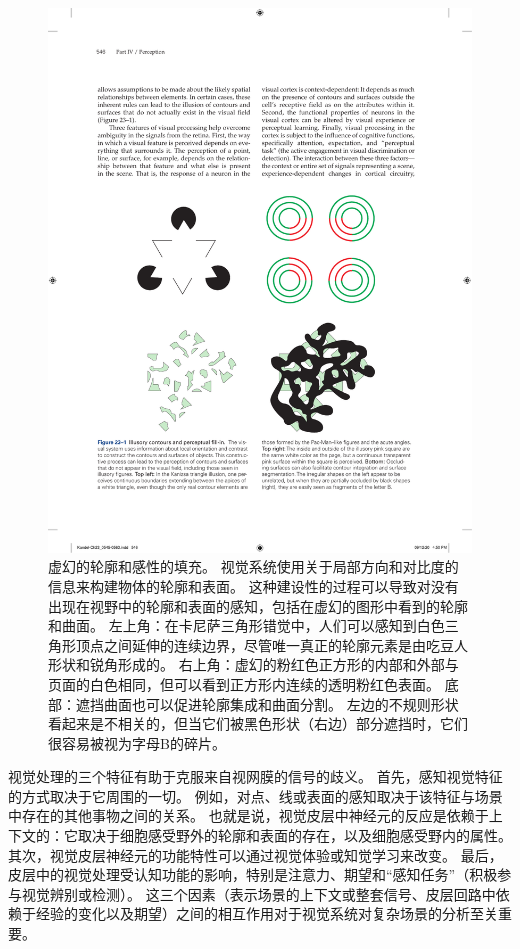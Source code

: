 \begin{figure}[htbp]
	\centering
	\includegraphics[width=1.0\linewidth]{chap23/fig_23_1}
	\caption{虚幻的轮廓和感性的填充。
		视觉系统使用关于局部方向和对比度的信息来构建物体的轮廓和表面。
		这种建设性的过程可以导致对没有出现在视野中的轮廓和表面的感知，包括在虚幻的图形中看到的轮廓和曲面。
		左上角：在卡尼萨三角形错觉中，人们可以感知到白色三角形顶点之间延伸的连续边界，尽管唯一真正的轮廓元素是由吃豆人形状和锐角形成的。
		右上角：虚幻的粉红色正方形的内部和外部与页面的白色相同，但可以看到正方形内连续的透明粉红色表面。
		底部：遮挡曲面也可以促进轮廓集成和曲面分割。
		左边的不规则形状看起来是不相关的，但当它们被黑色形状（右边）部分遮挡时，它们很容易被视为字母B的碎片。}
	\label{fig:23_1}
\end{figure}


视觉处理的三个特征有助于克服来自视网膜的信号的歧义。
首先，感知视觉特征的方式取决于它周围的一切。
例如，对点、线或表面的感知取决于该特征与场景中存在的其他事物之间的关系。
也就是说，视觉皮层中神经元的反应是依赖于上下文的：它取决于细胞感受野外的轮廓和表面的存在，以及细胞感受野内的属性。
其次，视觉皮层神经元的功能特性可以通过视觉体验或知觉学习来改变。
最后，皮层中的视觉处理受认知功能的影响，特别是注意力、期望和“感知任务”（积极参与视觉辨别或检测）。
这三个因素（表示场景的上下文或整套信号、皮层回路中依赖于经验的变化以及期望）之间的相互作用对于视觉系统对复杂场景的分析至关重要。


